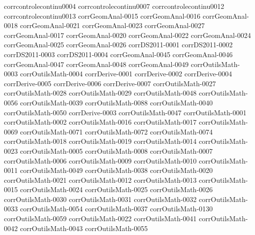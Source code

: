 {corrcontrolecontinu0004}
{corrcontrolecontinu0007}
{corrcontrolecontinu0012}
{corrcontrolecontinu0013}
{corrGeomAnal-0015}
{corrGeomAnal-0016}
{corrGeomAnal-0018}
{corrGeomAnal-0021}
{corrGeomAnal-0023}
{corrGeomAnal-0027}
{corrGeomAnal-0017}
{corrGeomAnal-0020}
{corrGeomAnal-0022}
{corrGeomAnal-0024}
{corrGeomAnal-0025}
{corrGeomAnal-0026}
{corrDS2011-0001}
{corrDS2011-0002}
{corrDS2011-0003}
{corrDS2011-0004}
{corrGeomAnal-0045}
{corrGeomAnal-0046}
{corrGeomAnal-0047}
{corrGeomAnal-0048}
{corrGeomAnal-0049}
{corrOutilsMath-0003}
{corrOutilsMath-0004}
{corrDerive-0001}
{corrDerive-0002}
{corrDerive-0004}
{corrDerive-0005}
{corrDerive-0006}
{corrDerive-0007}
{corrOutilsMath-0027}
{corrOutilsMath-0028}
{corrOutilsMath-0029}
{corrOutilsMath-0048}
{corrOutilsMath-0056}
{corrOutilsMath-0039}
{corrOutilsMath-0088}
{corrOutilsMath-0040}
{corrOutilsMath-0050}
{corrDerive-0003}
{corrOutilsMath-0047}
{corrOutilsMath-0001}
{corrOutilsMath-0002}
{corrOutilsMath-0016}
{corrOutilsMath-0017}
{corrOutilsMath-0069}
{corrOutilsMath-0071}
{corrOutilsMath-0072}
{corrOutilsMath-0074}
{corrOutilsMath-0018}
{corrOutilsMath-0019}
{corrOutilsMath-0014}
{corrOutilsMath-0023}
{corrOutilsMath-0005}
{corrOutilsMath-0008}
{corrOutilsMath-0007}
{corrOutilsMath-0006}
{corrOutilsMath-0009}
{corrOutilsMath-0010}
{corrOutilsMath-0011}
{corrOutilsMath-0049}
{corrOutilsMath-0038}
{corrOutilsMath-0020}
{corrOutilsMath-0021}
{corrOutilsMath-0012}
{corrOutilsMath-0013}
{corrOutilsMath-0015}
{corrOutilsMath-0024}
{corrOutilsMath-0025}
{corrOutilsMath-0026}
{corrOutilsMath-0030}
{corrOutilsMath-0031}
{corrOutilsMath-0032}
{corrOutilsMath-0033}
{corrOutilsMath-0054}
{corrOutilsMath-0037}
{corrOutilsMath-0130}
{corrOutilsMath-0059}
{corrOutilsMath-0022}
{corrOutilsMath-0041}
{corrOutilsMath-0042}
{corrOutilsMath-0043}
{corrOutilsMath-0055}
